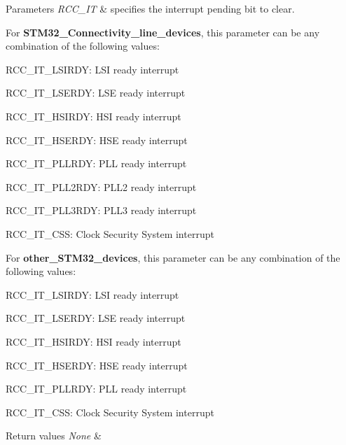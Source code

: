 \begin{DoxyParams}{Parameters}
{\em R\+C\+C\+\_\+\+IT} & specifies the interrupt pending bit to clear.\\
\hline
\end{DoxyParams}
For {\bfseries S\+T\+M32\+\_\+\+Connectivity\+\_\+line\+\_\+devices}, this parameter can be any combination of the following values\+: \begin{DoxyItemize}
\item R\+C\+C\+\_\+\+I\+T\+\_\+\+L\+S\+I\+R\+DY\+: L\+SI ready interrupt \item R\+C\+C\+\_\+\+I\+T\+\_\+\+L\+S\+E\+R\+DY\+: L\+SE ready interrupt \item R\+C\+C\+\_\+\+I\+T\+\_\+\+H\+S\+I\+R\+DY\+: H\+SI ready interrupt \item R\+C\+C\+\_\+\+I\+T\+\_\+\+H\+S\+E\+R\+DY\+: H\+SE ready interrupt \item R\+C\+C\+\_\+\+I\+T\+\_\+\+P\+L\+L\+R\+DY\+: P\+LL ready interrupt \item R\+C\+C\+\_\+\+I\+T\+\_\+\+P\+L\+L2\+R\+DY\+: P\+L\+L2 ready interrupt \item R\+C\+C\+\_\+\+I\+T\+\_\+\+P\+L\+L3\+R\+DY\+: P\+L\+L3 ready interrupt \item R\+C\+C\+\_\+\+I\+T\+\_\+\+C\+SS\+: Clock Security System interrupt\end{DoxyItemize}
For {\bfseries other\+\_\+\+S\+T\+M32\+\_\+devices}, this parameter can be any combination of the following values\+: \begin{DoxyItemize}
\item R\+C\+C\+\_\+\+I\+T\+\_\+\+L\+S\+I\+R\+DY\+: L\+SI ready interrupt \item R\+C\+C\+\_\+\+I\+T\+\_\+\+L\+S\+E\+R\+DY\+: L\+SE ready interrupt \item R\+C\+C\+\_\+\+I\+T\+\_\+\+H\+S\+I\+R\+DY\+: H\+SI ready interrupt \item R\+C\+C\+\_\+\+I\+T\+\_\+\+H\+S\+E\+R\+DY\+: H\+SE ready interrupt \item R\+C\+C\+\_\+\+I\+T\+\_\+\+P\+L\+L\+R\+DY\+: P\+LL ready interrupt\end{DoxyItemize}
\begin{DoxyItemize}
\item R\+C\+C\+\_\+\+I\+T\+\_\+\+C\+SS\+: Clock Security System interrupt 
\begin{DoxyRetVals}{Return values}
{\em None} & \\
\hline
\end{DoxyRetVals}
\end{DoxyItemize}


